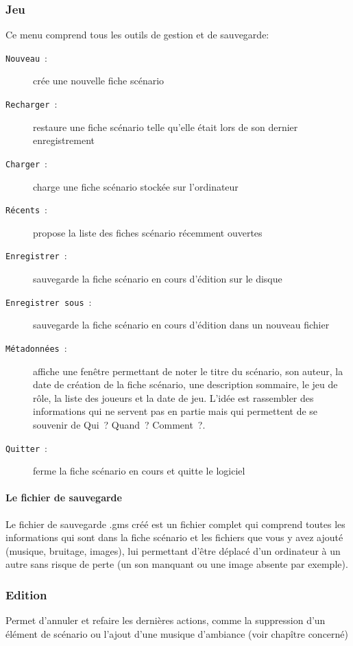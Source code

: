 \documentclass[a4paper,12pt]{article}
\newcommand*{\interfaceitem}[1]{\texttt{#1}}
\newcommand*{\guillemets}[1]{\og #1\fg{}\xspace}
\begin{document}
\subsubsection{Jeu}
Ce menu comprend tous les outils de gestion et de sauvegarde:
\begin{description}
    \item[\interfaceitem{Nouveau}~:]{crée une nouvelle fiche scénario}
    \item[\interfaceitem{Recharger}~:]{restaure une fiche scénario telle qu'elle était lors de son dernier enregistrement}
    \item[\interfaceitem{Charger}~:]{charge une fiche scénario stockée sur l'ordinateur}
    \item[\interfaceitem{Récents}~:]{propose la liste des fiches scénario récemment ouvertes}
    \item[\interfaceitem{Enregistrer}~:]{sauvegarde la fiche scénario en cours d'édition sur le disque}
    \item[\interfaceitem{Enregistrer sous}~:]{sauvegarde la fiche scénario en cours d'édition dans un nouveau fichier}
    \item[\interfaceitem{Métadonnées}~:]{affiche une fenêtre permettant de noter le titre du scénario, son auteur, la date de création de la fiche scénario, une description sommaire, le jeu de rôle, la liste des joueurs et la date de jeu.
            L'idée est rassembler des informations qui ne servent pas en partie mais qui permettent de se souvenir de \guillemets{Qui~? Quand~? Comment~?}.}
    \item[\interfaceitem{Quitter}~:]{ferme la fiche scénario en cours et quitte le logiciel}
\end{description}
\paragraph{Le fichier de sauvegarde}
Le fichier de sauvegarde .gms créé est un fichier complet qui comprend toutes les informations qui sont dans la fiche scénario et les fichiers que vous y avez ajouté (musique, bruitage, images), lui permettant d'être déplacé d'un ordinateur à un autre sans risque de perte (un son manquant ou une image absente par exemple).
\subsubsection{Edition}
Permet d'annuler et refaire les dernières actions, comme la suppression d'un élément de scénario ou l'ajout d'une musique d'ambiance (voir chapître concerné)
\end{document}
